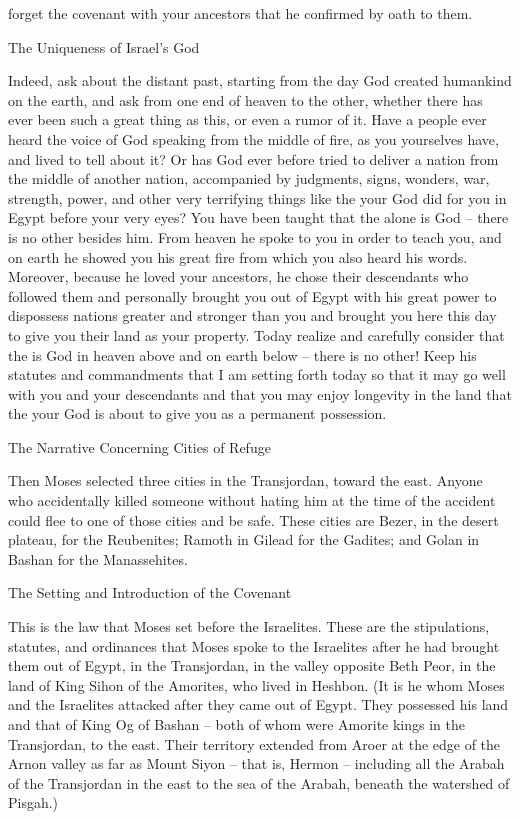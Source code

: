 {forget
the
covenant
with your ancestors
that
he confirmed by oath to them.
\par }{\SH The Uniqueness of Israel’s God
\par }{\PP {}Indeed,
ask
about the distant
past,
starting
from
the day
God
created
humankind
on
the earth,
and ask from one end
of heaven
to
the other,
whether there has ever been such a great
thing
as this,
or
even a rumor of it.
Have a people
ever heard
the voice
of God
speaking
from the middle
of fire,
as
you yourselves
have, and lived
to tell about it?
Or
has God
ever before tried
to deliver
a nation
from the middle
of another nation,
accompanied by judgments,
signs,
wonders,
war,
strength, power,
and other very
terrifying
things
like the
{}
your God
did
for you in Egypt
before your very eyes?
You have been
taught
that
the {}
alone
is
God
– there is no
other
besides him.
From
heaven
he spoke
to you in order
to teach
you, and on
earth
he showed
you his great
fire
from
which you also
heard
his words.
Moreover, because
he loved
your ancestors,
he chose
their descendants
who followed
them and personally brought
you out
of Egypt
with his great
power
to dispossess
nations
greater
and stronger
than
you and brought
you here this
day
to give
you their land
as your property.
Today
realize
and carefully
consider
that
the {}
is God
in heaven
above
and on
earth
below
– there is no
other!
Keep
his statutes
and commandments
that
I
am setting forth
today
so that
it may go well
with you and your descendants
and that
you may enjoy longevity
in
the land
that
the {}
your God
is about to give
you as a permanent possession.
\par }{\SH The Narrative Concerning Cities of Refuge
\par }{\PP {}Then
Moses
selected
three
cities
in the Transjordan,
toward the east.
Anyone
who accidentally
killed someone without
hating
him at the time of the accident
could flee
to
one
of those
cities
and be safe.
These cities are Bezer,
in the desert
plateau,
for the Reubenites;
Ramoth
in Gilead
for the Gadites;
and Golan
in Bashan
for the Manassehites.
\par }{\SH The Setting and Introduction of the Covenant
\par }{\PP {}This
is the law
that
Moses
set
before
the Israelites.
These
are the stipulations,
statutes,
and ordinances
that
Moses
spoke
to
the Israelites
after he had brought them out
of Egypt,
in the Transjordan,
in the valley
opposite
Beth Peor,
in the land
of King
Sihon
of the Amorites,
who
lived
in Heshbon.
(It is he whom
Moses
and the Israelites
attacked
after they came out
of Egypt.
They possessed
his land
and that of King
Og
of Bashan
– both
of whom
were Amorite
kings
in the Transjordan,
to the east.
Their territory extended from Aroer
at the edge
of the Arnon
valley
as far
as Mount
Siyon –
that
is, Hermon –
including all
the Arabah
of the Transjordan
in the east
to
the sea
of the Arabah,
beneath
the watershed
of Pisgah.)

}
